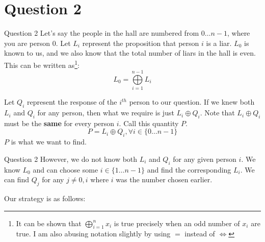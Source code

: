 \documentclass{beamer}
\begin{document}
    \section{Question 2}
    {
        \begin{frame}{Question 2}
            Let's say the people in the hall are numbered from $0 \dots n - 1$, where you are person $0$. Let $L_{i}$ represent the proposition that person $i$ is a liar. $L_{0}$ is known to us, and we also know that the total number of liars in the hall is even. This can be written as\footnote{It can be shown that $\bigoplus_{i = 1}^{n} x_{i}$ is true precisely when an odd number of $x_{i}$ are true. I am also abusing notation slightly by using $=$ instead of $\iff$}:
            \begin{equation*}
                L_{0} = \bigoplus\limits_{i = 1}^{n - 1} L_{i}
            \end{equation*}

            Let $Q_{i}$ represent the response of the $i^{th}$ person to our question. If we knew both $L_{i}$ and $Q_{i}$ for any person, then what we require is just $L_{i} \oplus Q_{i}$. Note that $L_{i} \oplus Q_{i}$ must be the \textbf{same} for every person $i$. Call this quantity $P$.
            \begin{equation*}
                P = L_{i} \oplus Q_{i}, \forall i \in \{0 \dots n - 1\}
            \end{equation*}
            $P$ is what we want to find.
        \end{frame}
        \begin{frame}{Question 2}
            However, we do not know both $L_{i}$ and $Q_{i}$ for any given person $i$. We know $L_{0}$ and can choose some $i \in \{1 \dots n - 1\}$ and find the corresponding $L_{i}$. We can find $Q_{j}$ for any $j \neq 0, i$ where $i$ was the number chosen earlier.
            
            Our strategy is as follows:


\end{frame}}
\end{document}
